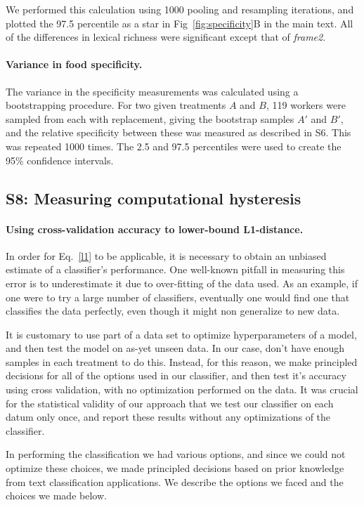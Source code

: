 \documentclass[12pt]{article}
\begin{document}
	We performed this calculation using 1000 pooling and resampling 
	iterations, and plotted the 97.5 percentile as a star in 
	Fig~\ref{fig:specificity}B in the main text.  All of the differences
	in lexical richness were significant except that of \textit{frame2}.

	\paragraph{Variance in food specificity.}
	The variance in the specificity measurements was calculated using a 
	bootstrapping procedure.  For two given treatments $A$ and $B$, 
	119 workers were sampled from each with replacement, giving the bootstrap
	samples $A'$ and $B'$, and the relative specificity between these 
	was measured as described in \textsection S6.
	This was repeated 1000 times.  The 2.5 and 97.5 percentiles were used
	to create the 95\% confidence intervals.


\subsection*{S8: Measuring computational hysteresis}
	\paragraph{Using cross-validation accuracy to lower-bound L1-distance.}
	In order for Eq.~\ref{l1} to be applicable, it is necessary to obtain
	an unbiased estimate of a classifier's performance.  One well-known
	pitfall in measuring this error is to underestimate it due to 
	over-fitting of the data used.  As an example, if one were to try 
	a large number of classifiers, eventually one would find one that
	classifies the data perfectly, even though it might non generalize to
	new data.

	It is customary to use part of a data set to optimize hyperparameters of
	a model, and then test the model on as-yet unseen data.  In our case,
	don't have enough samples in each treatment to do this.  Instead, for 
	this reason, we make principled decisions for all of the options used
	in our classifier, and then test it's accuracy using cross validation,
	with no optimization performed on the data.  It was crucial for 
	the statistical validity of our approach that we test our classifier on 
	each datum only once, and report these results without any optimizations
	of the classifier.

	In performing the classification we had various options, and since we
	could not optimize these choices, we made principled decisions based on
	prior knowledge from text classification applications.  We describe the
	options we faced and the choices we made below.
\end{document}
